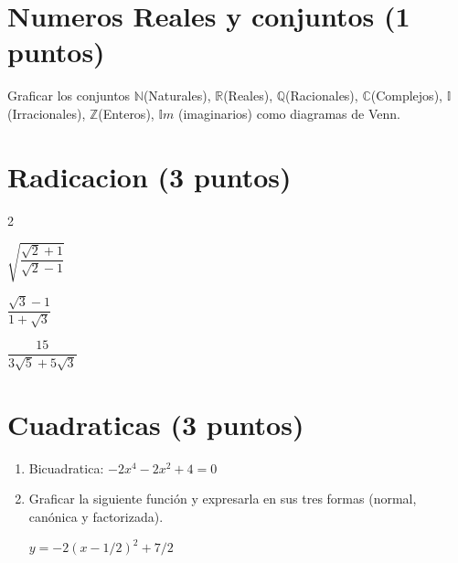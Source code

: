 \documentclass[a4paper,11pt,spanish,sans]{exam}
\begin{document}
\section{Numeros Reales y conjuntos (1 puntos) }
	Graficar los conjuntos $\mathbb{N}$(Naturales), $\mathbb{R}$(Reales), $\mathbb{Q}$(Racionales), $\mathbb{C}$(Complejos), $\mathbb{I}$(Irracionales), $\mathbb{Z}$(Enteros), $\mathbb{I}m$ (imaginarios) como diagramas de Venn.
	
\section{Radicacion (3 puntos)}
	
	\begin{enumerate}
		
	\end{enumerate}
	
\section{Cuadraticas (3 puntos)}
	\begin{enumerate}
		\item Bicuadratica: $-2x^4-2x^2+4=0$
		\item Graficar la siguiente función y expresarla en sus tres formas (normal, canónica y factorizada).
		
		$y=-2(x-1/2)^2+7/2$
	\end{enumerate}
	
\end{document}
